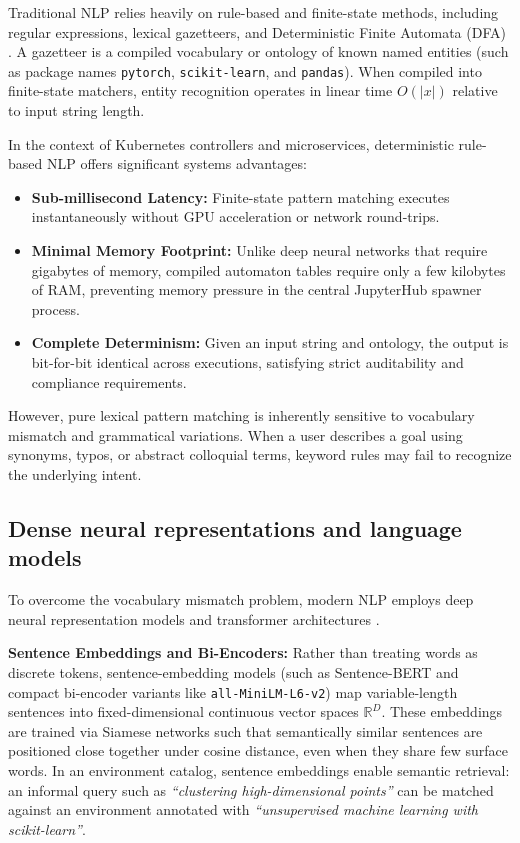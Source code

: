 Traditional NLP relies heavily on rule-based and finite-state methods, including regular expressions, lexical gazetteers, and Deterministic Finite Automata (DFA) \cite{jurafsky2023slp}. A gazetteer is a compiled vocabulary or ontology of known named entities (such as package names \texttt{pytorch}, \texttt{scikit-learn}, and \texttt{pandas}). When compiled into finite-state matchers, entity recognition operates in linear time $O(|x|)$ relative to input string length.

In the context of Kubernetes controllers and microservices, deterministic rule-based NLP offers significant systems advantages:
\begin{itemize}
    \item \textbf{Sub-millisecond Latency:} Finite-state pattern matching executes instantaneously without GPU acceleration or network round-trips.
    \item \textbf{Minimal Memory Footprint:} Unlike deep neural networks that require gigabytes of memory, compiled automaton tables require only a few kilobytes of RAM, preventing memory pressure in the central JupyterHub spawner process.
    \item \textbf{Complete Determinism:} Given an input string and ontology, the output is bit-for-bit identical across executions, satisfying strict auditability and compliance requirements.
\end{itemize}
However, pure lexical pattern matching is inherently sensitive to vocabulary mismatch and grammatical variations. When a user describes a goal using synonyms, typos, or abstract colloquial terms, keyword rules may fail to recognize the underlying intent.

\subsection{Dense neural representations and language models}
\label{subsec:neural_nlp}

To overcome the vocabulary mismatch problem, modern NLP employs deep neural representation models and transformer architectures \cite{sentencebert}.

\textbf{Sentence Embeddings and Bi-Encoders:} Rather than treating words as discrete tokens, sentence-embedding models (such as Sentence-BERT \cite{sentencebert} and compact bi-encoder variants like \texttt{all-MiniLM-L6-v2}) map variable-length sentences into fixed-dimensional continuous vector spaces $\mathbb{R}^D$. These embeddings are trained via Siamese networks such that semantically similar sentences are positioned close together under cosine distance, even when they share few surface words. In an environment catalog, sentence embeddings enable semantic retrieval: an informal query such as \emph{``clustering high-dimensional points''} can be matched against an environment annotated with \emph{``unsupervised machine learning with scikit-learn''}.

